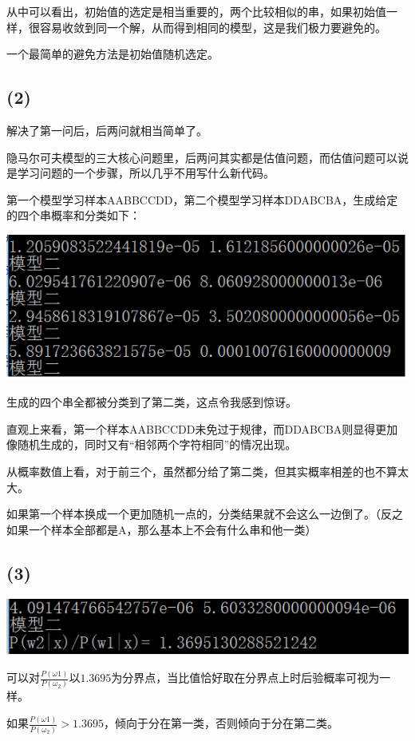 \documentclass{ctexart}
\begin{document}
从中可以看出，初始值的选定是相当重要的，两个比较相似的串，如果初始值一样，很容易收敛到同一个解，从而得到相同的模型，这是我们极力要避免的。

一个最简单的避免方法是初始值随机选定。
\subsection*{(2)}
解决了第一问后，后两问就相当简单了。

隐马尔可夫模型的三大核心问题里，后两问其实都是估值问题，而估值问题可以说是学习问题的一个步骤，所以几乎不用写什么新代码。

第一个模型学习样本AABBCCDD，第二个模型学习样本DDABCBA，生成给定的四个串概率和分类如下：

\includegraphics{6.png}

生成的四个串全都被分类到了第二类，这点令我感到惊讶。

直观上来看，第一个样本AABBCCDD未免过于规律，而DDABCBA则显得更加像随机生成的，同时又有“相邻两个字符相同”的情况出现。

从概率数值上看，对于前三个，虽然都分给了第二类，但其实概率相差的也不算太大。

如果第一个样本换成一个更加随机一点的，分类结果就不会这么一边倒了。（反之如果一个样本全部都是A，那么基本上不会有什么串和他一类）

\subsection*{(3)}

\includegraphics{7.png}

可以对$\frac{P(\omega1)}{P(\omega_2)}$以$1.3695$为分界点，当比值恰好取在分界点上时后验概率可视为一样。

如果$\frac{P(\omega1)}{P(\omega_2)}>1.3695$，倾向于分在第一类，否则倾向于分在第二类。
\end{document}
